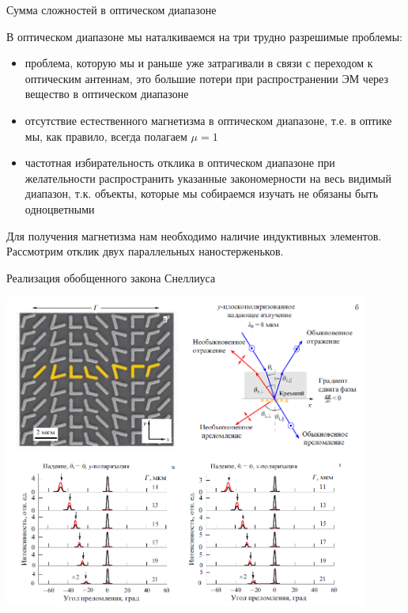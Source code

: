 \documentclass[9pt, compress, xcolor=table]{beamer}
\begin{document}
\begin{frame}{Сумма сложностей в оптическом диапазоне}

В оптическом диапазоне мы наталкиваемся на три трудно разрешимые проблемы:

\begin{itemize}
\item проблема, которую мы и раньше уже затрагивали в связи с переходом к оптическим антеннам, это большие потери при распространении ЭМ через вещество в оптическом диапазоне

\item отсутствие естественного магнетизма в оптическом диапазоне, т.е. в оптике мы, как правило, всегда полагаем $\mu=1$

\item частотная избирательность отклика в оптическом диапазоне при желательности распространить указанные закономерности на весь видимый диапазон, т.к. объекты, которые мы собираемся изучать не обязаны быть одноцветными
\end{itemize}

Для получения магнетизма нам необходимо наличие индуктивных элементов. Рассмотрим отклик двух параллельных наностерженьков.  

\end{frame}

\begin{frame}{Реализация обобщенного закона Снеллиуса}
  \begin{center}
\includegraphics[width=0.9\textwidth]{nanorod2}
\end{center}  
\end{frame}
\end{document}
